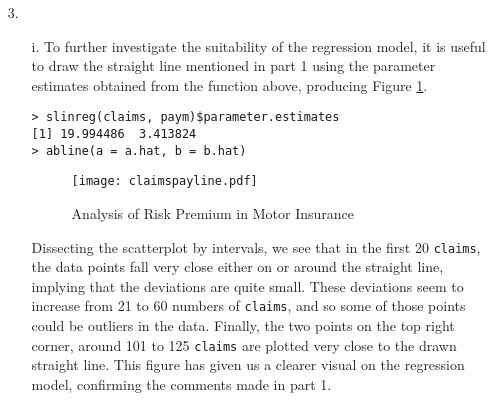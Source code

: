 \documentclass[11pt,a4]{article}
\begin{document}
\begin{itemize}
\begin{verbatim}
$residual.degrees.of.freedom
[1] 61
\end{verbatim}

These values can be confirmed by extracting information from the built in R function;

\begin{verbatim}
> lmswdins = lm(paym~claims)
> lmswdins$coefficients
> lmswdins$fitted.values
> lmswdins$residuals
\end{verbatim}

To then ease the further calculations and analysis, we store the values obtained from the function in the objects below.

\begin{verbatim}
a.hat = slinreg(claims, paym)$parameter.estimates[1] 
b.hat = slinreg(claims, paym)$parameter.estimates[2] 
fit.val = slinreg(claims, paym)$fitted.values
est.res = slinreg(claims, paym)$residuals
\end{verbatim}

\item[3.]

\begin{itemize}
    \item [i.]
To further investigate the suitability of the regression model, it is useful to draw the straight line mentioned in part 1 using the parameter estimates obtained from the function above, producing Figure \ref{fig:2}.

    \begin{verbatim}
> slinreg(claims, paym)$parameter.estimates
[1] 19.994486  3.413824
> abline(a = a.hat, b = b.hat)
    \end{verbatim}
    
    \begin{figure}[hbt!]
        \centering
        \texttt{[image: claimspayline.pdf]}
        \caption{Analysis of Risk Premium in Motor Insurance}
        \label{fig:2}
    \end{figure}
    
Dissecting the scatterplot by intervals, we see that in the first 20 \verb|claims|, the data points fall very close either on or around the straight line, implying that the deviations are quite small. These deviations seem to increase from 21 to 60 numbers of \verb|claims|, and so some of those points could be outliers in the data. Finally, the two points on the top right corner, around 101 to 125 \verb|claims| are plotted very close to the drawn straight line. This figure has given us a clearer visual on the regression model, confirming the comments made in part 1.


\end{itemize}
\end{itemize}
\end{document}
